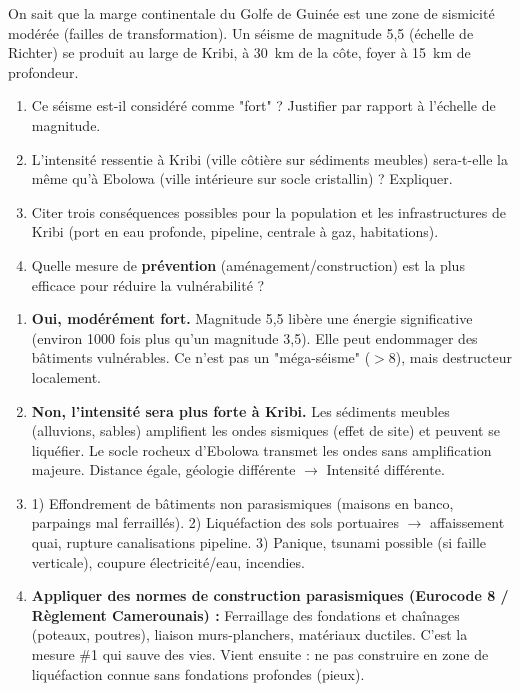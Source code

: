 \documentclass[11pt]{article}
\begin{document}
\begin{exercice}
On sait que la marge continentale du Golfe de Guinée est une zone de sismicité modérée (failles de transformation). Un séisme de magnitude 5,5 (échelle de Richter) se produit au large de Kribi, à \SI{30}{km} de la côte, foyer à \SI{15}{km} de profondeur.
\begin{enumerate}
    \item Ce séisme est-il considéré comme "fort" ? Justifier par rapport à l'échelle de magnitude.
    \item L'intensité ressentie à Kribi (ville côtière sur sédiments meubles) sera-t-elle la même qu'à Ebolowa (ville intérieure sur socle cristallin) ? Expliquer.
    \item Citer trois conséquences possibles pour la population et les infrastructures de Kribi (port en eau profonde, pipeline, centrale à gaz, habitations).
    \item Quelle mesure de \textbf{prévention} (aménagement/construction) est la plus efficace pour réduire la vulnérabilité ?
\end{enumerate}
\end{exercice}

\begin{corrige}
\begin{enumerate}
    \item \textbf{Oui, modérément fort.} Magnitude 5,5 libère une énergie significative (environ 1000 fois plus qu'un magnitude 3,5). Elle peut endommager des bâtiments vulnérables. Ce n'est pas un "méga-séisme" ($>8$), mais destructeur localement.
    \item \textbf{Non, l'intensité sera plus forte à Kribi.} Les sédiments meubles (alluvions, sables) amplifient les ondes sismiques (effet de site) et peuvent se liquéfier. Le socle rocheux d'Ebolowa transmet les ondes sans amplification majeure. Distance égale, géologie différente $\rightarrow$ Intensité différente.
    \item 1) Effondrement de bâtiments non parasismiques (maisons en banco, parpaings mal ferraillés). 2) Liquéfaction des sols portuaires $\rightarrow$ affaissement quai, rupture canalisations pipeline. 3) Panique, tsunami possible (si faille verticale), coupure électricité/eau, incendies.
    \item \textbf{Appliquer des normes de construction parasismiques (Eurocode 8 / Règlement Camerounais) :} Ferraillage des fondations et chaînages (poteaux, poutres), liaison murs-planchers, matériaux ductiles. C'est la mesure \#1 qui sauve des vies. Vient ensuite : ne pas construire en zone de liquéfaction connue sans fondations profondes (pieux).
\end{enumerate}
\end{corrige}
\end{document}
